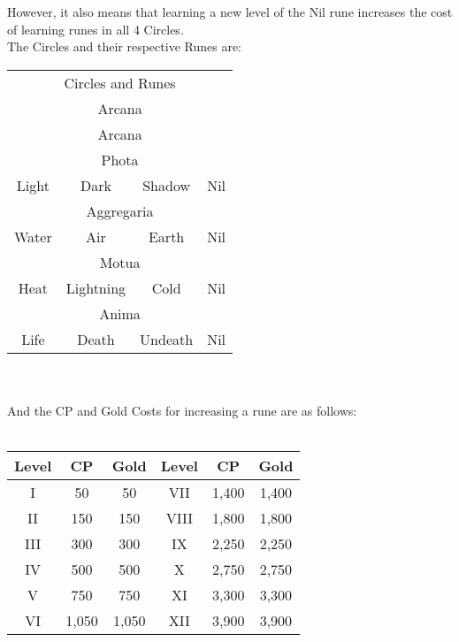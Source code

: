 However, it also means that learning a new level of the Nil rune increases the cost of learning runes in all 4 Circles.\\

The Circles and their respective Runes are:

\begin{tabular}{c | c | c | c}
	\multicolumn{4}{c}{Circles and Runes}\\
	\multicolumn{4}{c}{Arcana} \\
	\multicolumn{4}{c}{Arcana} \\
	\hline
	\hline
	\multicolumn{4}{c}{Phota}\\
	Light & Dark & Shadow & Nil\\
	\hline
	\hline
	\multicolumn{4}{c}{Aggregaria}\\
	Water & Air & Earth & Nil\\
	\hline
	\hline
	\multicolumn{4}{c}{Motua}\\
	Heat & Lightning & Cold & Nil\\
	\hline
	\hline
	\multicolumn{4}{c}{Anima}\\
	Life & Death & Undeath & Nil\\
\end{tabular}
\\
\\
And the CP and Gold Costs for increasing a rune are as follows:
\\
\\
\begin{tabular}{c | c | c || c | c | c}
	Level & CP & Gold & Level & CP & Gold \\ \hline
	I & 50 & 50 & VII & 1,400 & 1,400 \\
	II & 150 & 150 & VIII & 1,800 & 1,800 \\
	III & 300 & 300 & IX & 2,250 & 2,250 \\
	IV & 500 & 500 & X & 2,750 & 2,750 \\
	V & 750 & 750 & XI & 3,300 & 3,300 \\
	VI & 1,050 & 1,050 & XII & 3,900 & 3,900 \\
\end{tabular}

	
	
	
	
	
	
	
	
